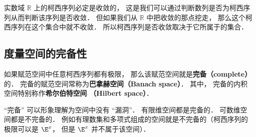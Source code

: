 实数域 $\mathbb R$ 上的柯西序列必定是收敛的， 这是我们可以通过判断数列是否为柯西序列从而判断该序列是否收敛． 但如果我们从 $\mathbb R$ 中把收敛的那点挖走， 那么这个柯西序列在这个集合中就不收敛． 所以柯西序列是否收敛取决于它所属于的集合． %

\subsection{度量空间的完备性}
如果赋范空间中任意柯西序列都有极限， 那么该赋范空间就是\textbf{完备（complete）}的． 完备的赋范空间常称为\textbf{巴拿赫空间（Banach space）}． 其中， 完备的内积空间特别称作\textbf{希尔伯特空间 （Hilbert space）}．

“完备” 可以形象理解为空间中没有 “漏洞”． 有限维空间都是完备的． 可数维空间都是不完备的． 例如有理数集和多项式组成的空间就是不完备的（柯西序列的极限可以是 $\E^x$， 但是 $\E^x$ 并不属于该空间）．
